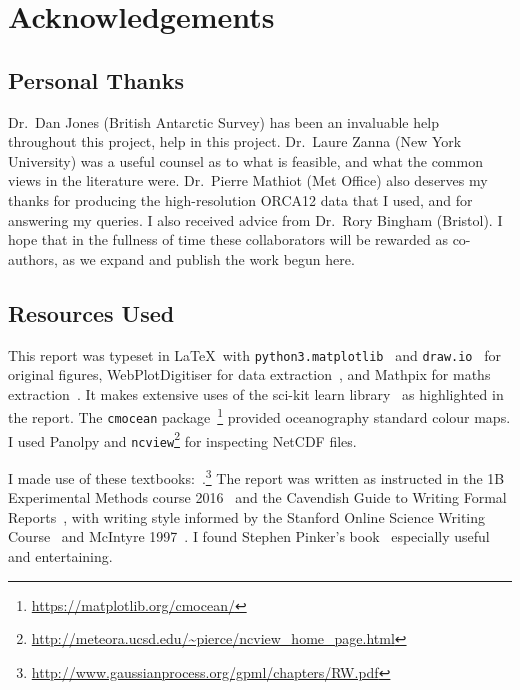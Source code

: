 \documentclass[../main.tex]{subfiles}
\begin{document}
\section{Acknowledgements}
\subsection{Personal Thanks}
Dr.\ Dan Jones (British Antarctic Survey) has been an invaluable help throughout this project,
help in this project.
Dr.\ Laure Zanna (New York University) was a useful counsel as to what is feasible,
 and what the common views in the literature were.
Dr.\ Pierre Mathiot (Met Office) also deserves my thanks for
producing the high-resolution ORCA12 data that I used, and
for answering my queries.
I also received advice from Dr.\ Rory Bingham (Bristol).
I hope that in the fullness of time these collaborators will be rewarded
as co-authors, as we expand and publish the
work begun here.


\subsection{Resources Used}

This report was typeset in \LaTeX\
with \texttt{python3.matplotlib}~\cite{Hunter:2007} and \texttt{draw.io}~\cite{DrawIO}
for original figures, WebPlotDigitiser for data extraction~\cite{WebPlotDigitiser},
and Mathpix for maths extraction~\cite{mathpix}.
It makes extensive uses of the sci-kit learn library~\cite{scikit-learn} as highlighted in the report.
The \texttt{cmocean} package~\cite{thyng2016true}\footnote{\href{https://matplotlib.org/cmocean/}{https://matplotlib.org/cmocean/}}
provided oceanography standard colour maps.
I used Panolpy and \texttt{ncview}\footnote{\url{http://meteora.ucsd.edu/~pierce/ncview_home_page.html}}
for inspecting NetCDF files.

I made use of these textbooks:~\cite{roisin2010GFD,williams2011ocean,ITILA,
sivia2006data,landau1959course,faber1995fluid,williams2006gaussian,
murphy2012machine}.\footnote{\href{http://www.gaussianprocess.org/gpml/chapters/RW.pdf
}{http://www.gaussianprocess.org/gpml/chapters/RW.pdf}}
The report was written as instructed in the 1B Experimental Methods course
2016~\cite{presentation} and the Cavendish Guide to Writing Formal
Reports~\cite{LabNotes}, with writing style informed
by the Stanford Online Science Writing Course~\cite{ScienceWriting}
and McIntyre 1997~\cite{mcintyre1997lucidity}.
I found Stephen Pinker's book~\cite{pinker2015sense} especially useful and entertaining.
\end{document}
